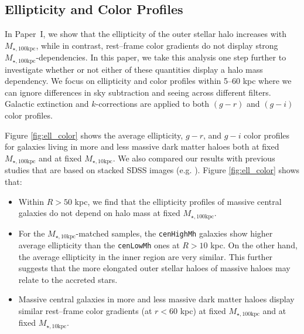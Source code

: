 \documentclass[a4paper,fleqn,usenatbib]{mnras}
\def\rbcg{\texttt{cenHighMh}}
\def\nbcg{\texttt{cenLowMh}}
\def\minn{{$M_{\star,10\mathrm{kpc}}$}}
\def\mtot{{$M_{\star,100\mathrm{kpc}}$}}
\begin{document}
\subsection{Ellipticity and Color Profiles}
    \label{ssec:ell_color}
    
    In Paper~I, we show that the ellipticity of the outer stellar halo increases with
    \mtot{}, while in contrast, rest--frame color gradients do not display strong 
    \mtot{}-dependencies. 
    In this paper, we take this analysis one step further to investigate whether or 
    not either of these quantities display a halo mass dependency. 
    We focus on ellipticity and color profiles within 5--60 kpc where we can ignore
    differences in sky subtraction and seeing across different filters. 
    Galactic extinction and $k$-corrections are applied to both $(g-r)$ and $(g-i)$ 
    color profiles.
    
    Figure \ref{fig:ell_color} shows the average ellipticity, $g-r$, and $g-i$ color 
    profiles for galaxies living in more and less massive dark matter haloes both at 
    fixed \mtot{} and at fixed \minn{}. 
    We also compared our results with previous studies that are based on stacked SDSS 
    images (e.g. \citealt{LaBarbera2010, Tal2011, DSouza2014}). 
    Figure \ref{fig:ell_color} shows that: 
    
    \begin{itemize}
        \item Within $R>50$ kpc, we find that the ellipticity profiles of massive 
            central galaxies do not depend on halo mass at fixed \mtot{}.        
                
        \item For the \minn{}-matched samples, the \rbcg{} galaxies show higher
            average ellipticity than the \nbcg{} ones at $R > 10$ kpc. 
            On the other hand, the average ellipticity in the inner region are very 
            similar. 
            This further suggests that the more elongated outer stellar haloes 
            of massive haloes may relate to the accreted stars.
                     
        \item Massive central galaxies in more and less massive dark matter haloes 
            display similar rest--frame color gradients (at $r<60$ kpc) at fixed 
            \mtot{} and at fixed  \minn{}.    
            
    \end{itemize}
    
\end{document}
